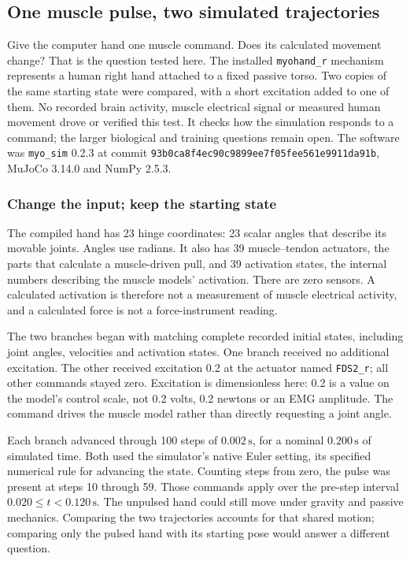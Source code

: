 \subsection{One muscle pulse, two simulated trajectories}

Give the computer hand one muscle command. Does its calculated movement change? That is the question tested here. The installed \texttt{myohand\_r} mechanism represents a human right hand attached to a fixed passive torso. Two copies of the same starting state were compared, with a short excitation added to one of them. No recorded brain activity, muscle electrical signal or measured human movement drove or verified this test. It checks how the simulation responds to a command; the larger biological and training questions remain open. The software was \texttt{myo\_sim} 0.2.3 at commit \texttt{93b0ca8f4ec90c9899ee7f05fee561e9911da91b}, MuJoCo 3.14.0 and NumPy 2.5.3.\cite{myohandMyoSimPinned2026,myohandMuJoCo3140,mujoco2012,myohandNumericalRecord20261105}

\subsubsection{Change the input; keep the starting state}

The compiled hand has 23 hinge coordinates: 23 scalar angles that describe its movable joints. Angles use radians. It also has 39 muscle--tendon actuators, the parts that calculate a muscle-driven pull, and 39 activation states, the internal numbers describing the muscle models' activation. There are zero sensors. A calculated activation is therefore not a measurement of muscle electrical activity, and a calculated force is not a force-instrument reading.

The two branches began with matching complete recorded initial states, including joint angles, velocities and activation states. One branch received no additional excitation. The other received excitation 0.2 at the actuator named \texttt{FDS2\_r}; all other commands stayed zero. Excitation is dimensionless here: 0.2 is a value on the model's control scale, not 0.2 volts, 0.2 newtons or an EMG amplitude. The command drives the muscle model rather than directly requesting a joint angle.

Each branch advanced through 100 steps of $0.002\,\mathrm{s}$, for a nominal $0.200\,\mathrm{s}$ of simulated time. Both used the simulator's native Euler setting, its specified numerical rule for advancing the state. Counting steps from zero, the pulse was present at steps 10 through 59. Those commands apply over the pre-step interval $0.020\leq t<0.120\,\mathrm{s}$. The unpulsed hand could still move under gravity and passive mechanics. Comparing the two trajectories accounts for that shared motion; comparing only the pulsed hand with its starting pose would answer a different question.

